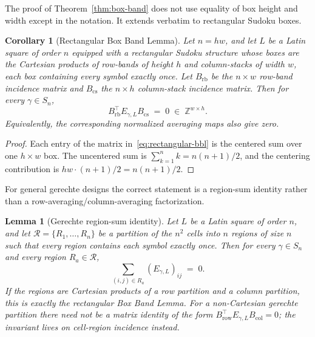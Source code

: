 \documentclass[11pt,a4paper]{article}
\newtheorem{lemma}[theorem]{Lemma}
\newtheorem{corollary}[theorem]{Corollary}
\theoremstyle{definition}
\theoremstyle{remark}
\providecommand{\Z}{\mathbb{Z}}
\begin{document}
The proof of Theorem~\ref{thm:box-band} does not use equality of box
height and width except in the notation. It extends verbatim to
rectangular Sudoku boxes.

\begin{corollary}[Rectangular Box Band Lemma]
\label{cor:rectangular-box-band}
Let $n=hw$, and let $L$ be a Latin square of order $n$ equipped with a
rectangular Sudoku structure whose boxes are the Cartesian products of
row-bands of height $h$ and column-stacks of width $w$, each box
containing every symbol exactly once. Let $B_{\mathrm{rb}}$ be the
$n\times w$ row-band incidence matrix and $B_{\mathrm{cs}}$ the
$n\times h$ column-stack incidence matrix. Then for every
$\gamma\in S_n$,
\begin{equation}\label{eq:rectangular-bbl}
   B_{\mathrm{rb}}^{\!\top} E_{\gamma,L} B_{\mathrm{cs}}
      \;=\; 0 \;\in\; \Z^{w\times h}.
\end{equation}
Equivalently, the corresponding normalized averaging maps also give
zero.
\end{corollary}

\begin{proof}
Each entry of the matrix in~\eqref{eq:rectangular-bbl} is the centered
sum over one $h\times w$ box. The uncentered sum is
$\sum_{k=1}^{n}k=n(n+1)/2$, and the centering contribution is
$hw\cdot(n+1)/2=n(n+1)/2$.
\end{proof}

For general gerechte designs the correct statement is a region-sum
identity rather than a row-averaging/column-averaging factorization.

\begin{lemma}[Gerechte region-sum identity]
\label{lem:gerechte-region-sum}
Let $L$ be a Latin square of order $n$, and let
$\mathcal R=\{R_1,\dots,R_n\}$ be a partition of the $n^2$ cells into
$n$ regions of size $n$ such that every region contains each symbol
exactly once. Then for every $\gamma\in S_n$ and every region
$R_a\in\mathcal R$,
\begin{equation}\label{eq:gerechte-region-sum}
   \sum_{(i,j)\in R_a} (E_{\gamma,L})_{ij} \;=\; 0.
\end{equation}
If the regions are Cartesian products of a row partition and a column
partition, this is exactly the rectangular Box Band Lemma. For a
non-Cartesian gerechte partition there need not be a matrix identity of
the form $B_{\mathrm{row}}^{\!\top}E_{\gamma,L}B_{\mathrm{col}}=0$;
the invariant lives on cell-region incidence instead.
\end{lemma}
\end{document}
